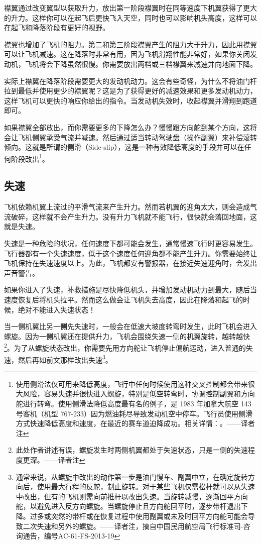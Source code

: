襟翼通过改变翼型以获取升力，放出第一阶段襟翼时在同等速度下机翼获得了更大的升力。这样你可以在起飞后更快飞入天空，同时也可以影响机头高度，这样可以在起飞和降落阶段有更好的视野。

襟翼也增加了飞机的阻力。第二和第三阶段襟翼产生的阻力大于升力，因此用襟翼可以让飞机减速。这在降落时非常有用，因为飞机滑翔性能非常好，如果你关闭发动机，飞机将会下降虽然很慢。你需要放出两档或三档襟翼来减速并向地面下降。

实际上襟翼在降落阶段需要更大的发动机动力。这会有些奇怪，为什么不将油门杆拉到最低并使用更少的襟翼呢？这是为了获得更好的减速效果和更多发动机动力，这样飞机可以更快的响应你给出的指令。当发动机失效时，收起襟翼并滑翔到跑道即可。

如果襟翼全部放出，而你需要更多的下降怎么办？慢慢蹬方向舵到某个方向，这将会让飞机侧翼承受气流并减速。然后通过适当转动驾驶盘（操作副翼）来补偿滚转倾向。这就是所谓的侧滑（Side-slip），这是一种有效降低高度的手段并可以在任何阶段改出\footnote{使用侧滑法仅可用来降低高度，飞行中任何时候使用这种交叉控制都会带来很大风险，容易失速并很快进入螺旋，特别是低空转弯时，协调控制副翼和方向舵进行转弯。使用侧滑法降低高度最有名的例子，是 1983 年加拿大航空 143 号客机（机型 767-233）因为燃油耗尽导致发动机空中停车。飞行员使用侧滑方式快速降低高度和速度，在最近的赛车道迫降成功。相关详情：。——译者注}。

\subsection{失速}
\label{sec:Stall}

飞机依赖机翼上流过的平滑气流来产生升力。然而若机翼的迎角太大，则会造成气流破碎，这样就不会产生升力。没有升力飞机就不能飞行，很快就会落回地面，这就是失速。

失速是一种危险的状况，任何速度下都可能会发生，通常慢速飞行时更容易发生。飞行器都有一个失速速度，低于这个速度任何迎角都不能产生升力。你需要始终让飞机保持在失速速度以上。为此，飞机都安有警报器，在接近失速迎角时，会发出声音警告。

如果你进入了失速，补救措施是尽快降低机头，并增加发动机动力到最大，随后当速度恢复后将机头拉平。然而这么做会让飞机失去高度，因此在降落和起飞的时候，绝对不能进入失速状态！

当一侧机翼比另一侧先失速时，一般会在低速大坡度转弯时发生，此时飞机会进入螺旋。因为一侧机翼还在提供升力，飞机会围绕失速一侧的机翼旋转，越转越快\footnote{此处作者讲述有误，螺旋发生时两侧机翼都处于失速状态，只是一侧的失速程度更深。——译者注}。为了从螺旋状态改出，你需要先用方向舵让飞机停止偏航运动，进入普通的失速，然后再如前文那样改出失速\footnote{通常来说，从螺旋中改出的动作第一步是油门慢车、副翼中立，在确定旋转方向后，使用最大行程的反舵，制止旋转。对于某些飞机仅需松杆就可以从失速中改出，但有的飞机则需向前推杆以改出失速。当旋转减慢，逐渐回平方向舵，以避免进入反方向螺旋。当螺旋停止且方向舵回平时，逐步带杆退出下降。过多或突然的带杆或在恢复过程中使用副翼或未及时回平方向舵可能会导致二次失速和另外的螺旋。——译者注，摘自中国民用航空局飞行标准司-咨询通告，编号AC-61-FS-2013-19}。

